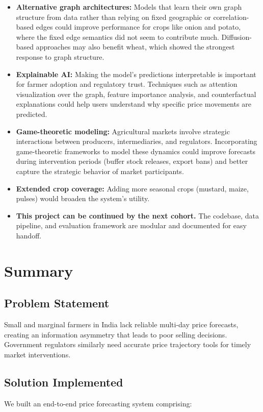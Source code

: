 \documentclass[12pt,a4paper]{article}
\begin{document}
\begin{itemize}
\item \textbf{Alternative graph architectures:} Models that learn their own graph structure from data rather than relying on fixed geographic or correlation-based edges could improve performance for crops like onion and potato, where the fixed edge semantics did not seem to contribute much. Diffusion-based approaches may also benefit wheat, which showed the strongest response to graph structure.
\item \textbf{Explainable AI:} Making the model's predictions interpretable is important for farmer adoption and regulatory trust. Techniques such as attention visualization over the graph, feature importance analysis, and counterfactual explanations could help users understand why specific price movements are predicted.
\item \textbf{Game-theoretic modeling:} Agricultural markets involve strategic interactions between producers, intermediaries, and regulators. Incorporating game-theoretic frameworks to model these dynamics could improve forecasts during intervention periods (buffer stock releases, export bans) and better capture the strategic behavior of market participants.
\item \textbf{Extended crop coverage:} Adding more seasonal crops (mustard, maize, pulses) would broaden the system's utility.
\item \textbf{This project can be continued by the next cohort.} The codebase, data pipeline, and evaluation framework are modular and documented for easy handoff.
\end{itemize}
\section{Summary}
\subsection{Problem Statement}
Small and marginal farmers in India lack reliable multi-day price forecasts, creating an information asymmetry that leads to poor selling decisions. Government regulators similarly need accurate price trajectory tools for timely market interventions.

\subsection{Solution Implemented}
We built an end-to-end price forecasting system comprising:
\end{document}
